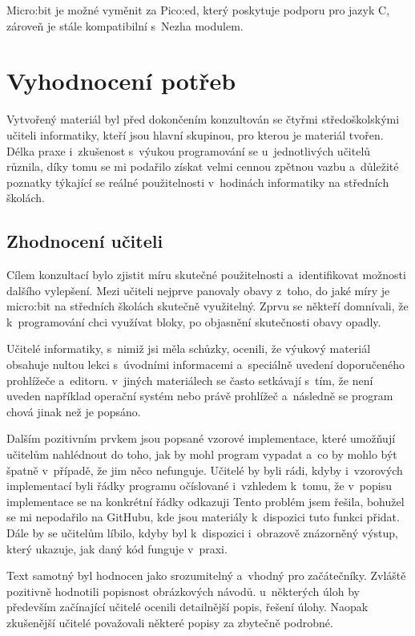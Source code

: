 \documentclass[
  digital,     %
  oneside,     %
  nosansbold,  %
  colorbold, %
  lof,         %
  nolot,         %
]{fithesis4}
\begin{document}
Micro:bit je možné vyměnit za Pico:ed, který poskytuje podporu pro jazyk C, zároveň je stále kompatibilní s~Nezha modulem. 

\chapter{Vyhodnocení potřeb}
Vytvořený materiál byl před dokončením konzultován se čtyřmi středoškolskými učiteli informatiky, kteří jsou hlavní skupinou, pro kterou je materiál tvořen. Délka praxe i~zkušenost s~výukou programování se u~jednotlivých učitelů různila, díky tomu se mi podařilo získat velmi cennou zpětnou vazbu a~důležité poznatky týkající se reálné použitelnosti v~hodinách informatiky na středních školách.

\section{Zhodnocení učiteli}
Cílem konzultací bylo zjistit míru skutečné použitelnosti a~identifikovat možnosti dalšího vylepšení. Mezi učiteli nejprve panovaly obavy z~toho, do jaké míry je micro:bit na středních školách skutečně využitelný. Zprvu se někteří domnívali, že k~programování chci využívat bloky, po objasnění skutečnosti obavy opadly.

Učitelé informatiky, s~nimiž jsi měla schůzky, ocenili, že výukový materiál obsahuje nultou lekci s~úvodními informacemi a~speciálně uvedení doporučeného prohlížeče a~editoru. v~jiných materiálech se často setkávají s~tím, že není uveden například operační systém nebo právě prohlížeč a~následně se program chová jinak než je popsáno. 

Dalším pozitivním prvkem jsou popsané vzorové implementace, které umožňují učitelům nahlédnout do toho, jak by mohl program vypadat a~co by mohlo být špatně v~případě, že jim něco nefunguje. Učitelé by byli rádi, kdyby i~vzorových implementací byli řádky programu očíslované i~vzhledem k~tomu, že v~popisu implementace se na konkrétní řádky odkazuji Tento problém jsem řešila, bohužel se mi nepodařilo na GitHubu, kde jsou materiály k~dispozici tuto funkci přidat. Dále by se učitelům líbilo, kdyby byl k~dispozici i~obrazově znázorněný výstup, který ukazuje, jak daný kód funguje v~praxi.

Text samotný byl hodnocen jako srozumitelný a~vhodný pro začátečníky. Zvláště pozitivně hodnotili  popisnost obrázkových návodů. u~některých úloh by především začínající učitelé ocenili detailnější popis, řešení úlohy. Naopak zkušenější učitelé považovali některé popisy za zbytečně podrobné.
\end{document}
